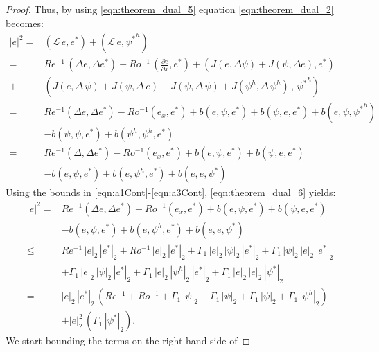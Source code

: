 \begin{proof}
  Thus, by using \eqref{eqn:theorem_dual_5} equation \eqref{eqn:theorem_dual_2}
  becomes:
  \begin{align}
    |e|^2 =& (\mathcal{L} \, e , e^*) + (\mathcal{L} \, e , {\psi^*}^h) \nonumber \\
    =& Re^{-1} \, (\Delta e , \Delta e^*)
      - Ro^{-1} \, \left( \frac{\partial e}{\partial x} , e^* \right)
      + \left( J(e , \Delta \psi) + J(\psi , \Delta e) , e^* \right) \nonumber \\
    +& \left( J(e , \Delta \, \psi) + J(\psi , \Delta \, e)
      - J(\psi , \Delta \, \psi) + J(\psi^h , \Delta \, \psi^h)
      \, , \, {\psi^*}^h \right) \nonumber \\
    =& Re^{-1} (\Delta e ,\Delta e^*) - Ro^{-1}(e_x , e^*)
      + b(e , \psi , e^*) + b(\psi , e, e^*) + b(e , \psi , {\psi^*}^h) \nonumber \\
    & - b(\psi , \psi , e^*) + b(\psi^h , \psi^h , e^*) \nonumber \\
    =& Re^{-1} (\Delta , \Delta e^*) - Ro^{-1}(e_x , e^*)
      + b(e , \psi , e^*) + b(\psi , e, e^*) \nonumber \\
    & - b(e , \psi , e^*) + b(e , \psi^h , e^*) + b(e , e , \psi^*)
    \label{eqn:theorem_dual_6}
  \end{align}
  Using the bounds in \eqref{eqn:a1Cont}-\eqref{eqn:a3Cont},
  \eqref{eqn:theorem_dual_6} yields:
  \begin{align}
    |e|^2 =& Re^{-1} (\Delta e ,\Delta e^*) - Ro^{-1} (e_x , e^*)
      + b(e , \psi , e^*) + b(\psi , e, e^*) \nonumber \\
    & - b(e , \psi , e^*) + b(e , \psi^h , e^*) + b(e , e , \psi^*) \nonumber \\
    \leq& Re^{-1} \, | e |_2 \, |e^* |_2 + Ro^{-1} \, | e |_2 \, |e^* |_2
      + \Gamma_1 \, | e |_2 \, | \psi |_2 \, | e^* |_2
      + \Gamma_1 \, | \psi |_2 \, | e |_2 \, | e^* |_2 \nonumber \\
    & + \Gamma_1 \, | e |_2 \, | \psi |_2 \, | e^* |_2
      + \Gamma_1 \, | e |_2 \, | \psi^h |_2 \, | e^* |_2
      + \Gamma_1 \, | e |_2 \, | e |_2 \, | \psi^* |_2 \nonumber \\
    =& | e |_2 \, |e^* |_2 \, \left( Re^{-1} + Ro^{-1} + \Gamma_1 \, | \psi |_2
      + \Gamma_1 \, | \psi |_2
      + \Gamma_1 \, | \psi |_2
      + \Gamma_1 \, | \psi^h |_2 \right) \nonumber \\
    & + | e |_2^2 \, \left( \Gamma_1 \, | \psi^* |_2 \right) .
    \label{eqn:theorem_dual_7}
  \end{align}
  We start bounding the terms on the right-hand side of

\end{proof}
